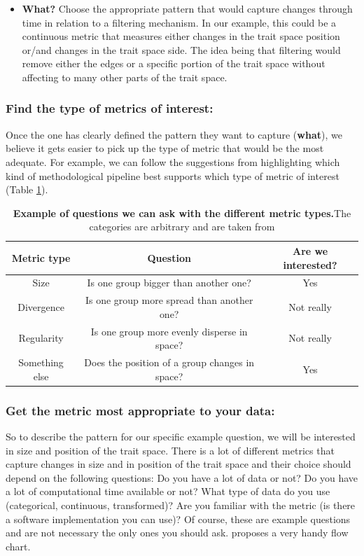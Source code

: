 \documentclass[12pt,letterpaper]{article}
\begin{document}
\begin{itemize}
    \item \textbf{What?} Choose the appropriate pattern that would capture changes through time in relation to a filtering mechanism. In our example, this could be a continuous metric that measures either changes in the trait space position or/and changes in the trait space side. The idea being that filtering would remove either the edges or a specific portion of the trait space without affecting to many other parts of the trait space.
\end{itemize}


\subsubsection{Find the type of metrics of interest:}

Once the one has clearly defined the pattern they want to capture (\textbf{what}), we believe it gets easier to pick up the type of metric that would be the most adequate.
For example, we can follow the suggestions from \cite{mammola2021concepts} highlighting which kind of methodological pipeline best supports which type of metric of interest (Table \ref{Tab:box2}).

\begin{table}
\center
\begin{tabular}{c | c | c}
\textbf{Metric type}  & \textbf{Question} & \textbf{Are we interested?}\\
\hline
Size & Is one group bigger than another one? & Yes \\
Divergence & Is one group more spread than another one? & Not really \\
Regularity & Is one group more evenly disperse in space? & Not really \\
Something else  & Does the position of a group changes in space? & Yes \\
\end{tabular}
\caption{\textbf{Example of questions we can ask with the different metric types.}The categories are arbitrary and are taken from \cite{mammola2021concepts}}
\label{Tab:box2}
\end{table}


\subsubsection{Get the metric most appropriate to your data:}

So to describe the pattern for our specific example question, we will be interested in size and position of the trait space.
There is a lot of different metrics that capture changes in size and in position of the trait space and their choice should depend on the following questions:
Do you have a lot of data or not?
Do you have a lot of computational time available or not?
What type of data do you use (categorical, continuous, transformed)?
Are you familiar with the metric (is there a software implementation you can use)?
Of course, these are example questions and are not necessary the only ones you should ask.
\cite{mammola2021concepts} proposes a very handy flow chart.
\end{document}
